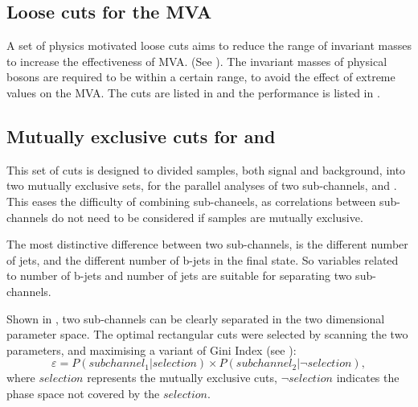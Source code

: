 \begin{table}[!tbp]
\caption[Pre-selection efficiency at .]%
{Pre-selection cut efficiency for signal and background samples at , assuming a luminosity of 1500\,$fb^{-1}$. The selection efficiencies are presented in a ``flow'' fashion, as the every selection cut contains all the cuts to the left of it.}
\label{tab:doubleHiggs1.4TeVPreslection}
\end{table}

\subsection{Loose cuts for the MVA}

A set of physics motivated  loose cuts aims to reduce the range of invariant masses to increase the effectiveness of MVA. (See \Section{}). The invariant masses of physical bosons are required to be within a certain range, to avoid the effect of extreme values on the MVA. The cuts are listed in  and the performance is listed in .

\subsection{Mutually exclusive cuts for \eeToHHbbWW and \eeToHHbbbb}
\label{sec:doubleHiggsMutualExclusive}
This set of cuts is designed to   divided samples, both signal and background, into two mutually exclusive sets, for the parallel analyses of  two sub-channels, \eeToHHbbWWHad and \eeToHHbbbb. This eases the difficulty of  combining sub-chaneels, as correlations between sub-channels do not need to be considered if samples are mutually exclusive.

The most distinctive difference between two sub-channels, is the different number of jets, and the different number of b-jets in the final state. So variables related to number of b-jets and number of jets are suitable for separating two sub-channels.

Shown in , two sub-channels can be clearly separated in the two dimensional parameter space. The optimal rectangular cuts were selected by scanning the two parameters, and maximising a variant of Gini Index (see \Section):
\begin{equation}
\varepsilon = P(subchannel_1|selection) \times P(subchannel_2|\neg{selection}),
\end{equation}
where $selection$ represents the mutually exclusive cuts, $\neg{selection}$ indicates the phase space not covered by the $selection$.

